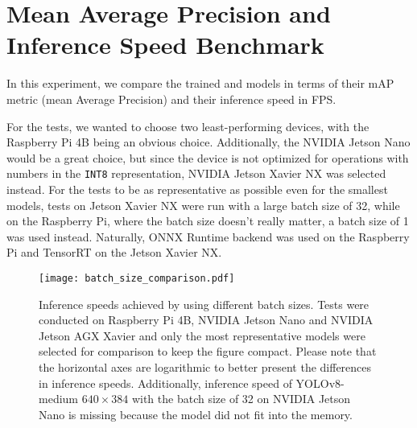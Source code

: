 \section{Mean Average Precision and Inference Speed Benchmark}
\label{FPSvsmAPComparison}

In this experiment, we compare the trained and models in terms of their mAP
metric (mean Average Precision) and their inference speed in FPS.

For the tests, we wanted to choose two least-performing devices, with the
Raspberry Pi 4B being an obvious choice. Additionally, the NVIDIA Jetson Nano
would be a great choice, but since the device is not optimized for operations
with numbers in the \texttt{INT8} representation, NVIDIA Jetson Xavier NX was
selected instead. For the tests to be as representative as possible even for the
smallest models, tests on Jetson Xavier NX were run with a large batch size of
32, while on the Raspberry Pi, where the batch size doesn't really matter, a
batch size of 1 was used instead. Naturally, ONNX Runtime backend was used on
the Raspberry Pi and TensorRT on the Jetson Xavier NX.

\begin{figure}[H]
    \begin{framed}
        \centering
        \texttt{[image: batch\_size\_comparison.pdf]}
        \caption{Inference speeds achieved by using different batch sizes. Tests
        were conducted on Raspberry Pi 4B, NVIDIA Jetson Nano and NVIDIA Jetson
        AGX Xavier and only the most representative models were selected for
        comparison to keep the figure compact. Please note that the horizontal
        axes are logarithmic to better present the differences in inference
        speeds. Additionally, inference speed of YOLOv8-medium $640 \times 384$
        with the batch size of 32 on NVIDIA Jetson Nano is missing because the
        model did not fit into the memory.}
        \label{BatchSizeComparison}
    \end{framed}
\end{figure}

